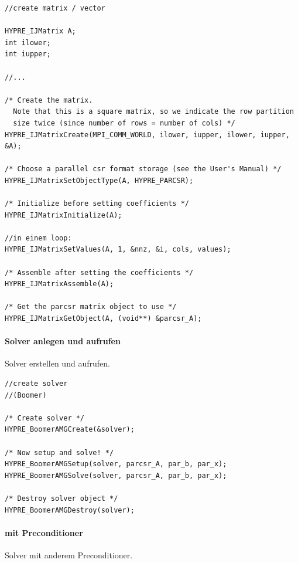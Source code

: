 \documentclass[a4paper,10pt]{article}
\begin{document}
\begin{lstlisting}[frame=single,caption=HYPRE Nutzung: Matrix anlegen (analog dazu Vektor), label=HYPRENutzungMatrix]
//create matrix / vector

HYPRE_IJMatrix A;
int ilower;
int iupper;

//...

/* Create the matrix.
  Note that this is a square matrix, so we indicate the row partition
  size twice (since number of rows = number of cols) */
HYPRE_IJMatrixCreate(MPI_COMM_WORLD, ilower, iupper, ilower, iupper, &A);

/* Choose a parallel csr format storage (see the User's Manual) */
HYPRE_IJMatrixSetObjectType(A, HYPRE_PARCSR);

/* Initialize before setting coefficients */
HYPRE_IJMatrixInitialize(A);

//in einem loop:
HYPRE_IJMatrixSetValues(A, 1, &nnz, &i, cols, values);

/* Assemble after setting the coefficients */
HYPRE_IJMatrixAssemble(A);

/* Get the parcsr matrix object to use */
HYPRE_IJMatrixGetObject(A, (void**) &parcsr_A);

\end{lstlisting}

\paragraph{Solver anlegen und aufrufen}

Solver erstellen und aufrufen.

\begin{lstlisting}[frame=single,caption=HYPRE Nutzung: Solver anlegen und aufrufen]
//create solver
//(Boomer)

/* Create solver */
HYPRE_BoomerAMGCreate(&solver);

/* Now setup and solve! */
HYPRE_BoomerAMGSetup(solver, parcsr_A, par_b, par_x);
HYPRE_BoomerAMGSolve(solver, parcsr_A, par_b, par_x);

/* Destroy solver object */
HYPRE_BoomerAMGDestroy(solver);

\end{lstlisting}

\paragraph{mit Preconditioner}

Solver mit anderem Preconditioner.
\end{document}

